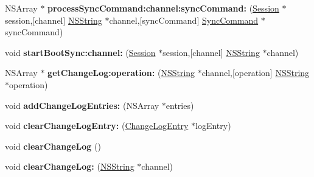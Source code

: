\begin{DoxyCompactItemize}
\item 
\hypertarget{interface_sync_engine_ad8be9dec33fb1b34dcbff07a2ae897ff}{
\-N\-S\-Array $\ast$ {\bfseries process\-Sync\-Command\-:channel\-:sync\-Command\-:} (\hyperlink{interface_session}{\-Session} $\ast$session,\mbox{[}channel\mbox{]} \hyperlink{class_n_s_string}{\-N\-S\-String} $\ast$channel,\mbox{[}sync\-Command\mbox{]} \hyperlink{interface_sync_command}{\-Sync\-Command} $\ast$sync\-Command)}
\label{interface_sync_engine_ad8be9dec33fb1b34dcbff07a2ae897ff}

\item 
\hypertarget{interface_sync_engine_a4ebd9b360794be097da8495f07f60fab}{
void {\bfseries start\-Boot\-Sync\-:channel\-:} (\hyperlink{interface_session}{\-Session} $\ast$session,\mbox{[}channel\mbox{]} \hyperlink{class_n_s_string}{\-N\-S\-String} $\ast$channel)}
\label{interface_sync_engine_a4ebd9b360794be097da8495f07f60fab}

\item 
\hypertarget{interface_sync_engine_a506d4ed2470f7f6654a279ca816480b5}{
\-N\-S\-Array $\ast$ {\bfseries get\-Change\-Log\-:operation\-:} (\hyperlink{class_n_s_string}{\-N\-S\-String} $\ast$channel,\mbox{[}operation\mbox{]} \hyperlink{class_n_s_string}{\-N\-S\-String} $\ast$operation)}
\label{interface_sync_engine_a506d4ed2470f7f6654a279ca816480b5}

\item 
\hypertarget{interface_sync_engine_ae5f3fe9c9d4b58f991a4f13b2d27afb0}{
void {\bfseries add\-Change\-Log\-Entries\-:} (\-N\-S\-Array $\ast$entries)}
\label{interface_sync_engine_ae5f3fe9c9d4b58f991a4f13b2d27afb0}

\item 
\hypertarget{interface_sync_engine_ad60a21dc70c02440080ba17d7973e07a}{
void {\bfseries clear\-Change\-Log\-Entry\-:} (\hyperlink{interface_change_log_entry}{\-Change\-Log\-Entry} $\ast$log\-Entry)}
\label{interface_sync_engine_ad60a21dc70c02440080ba17d7973e07a}

\item 
\hypertarget{interface_sync_engine_aa4e0a5df792b321106e8313cc1d33564}{
void {\bfseries clear\-Change\-Log} ()}
\label{interface_sync_engine_aa4e0a5df792b321106e8313cc1d33564}

\item 
\hypertarget{interface_sync_engine_a9233826cf0626c0dcd4136f93014222d}{
void {\bfseries clear\-Change\-Log\-:} (\hyperlink{class_n_s_string}{\-N\-S\-String} $\ast$channel)}
\label{interface_sync_engine_a9233826cf0626c0dcd4136f93014222d}


\end{DoxyCompactItemize}
